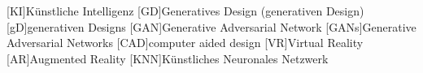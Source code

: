 \begin{acronym}
  [KI]{Künstliche Intelligenz}
  [GD]{Generatives Design (generativen Design)}
  [gD]{generativen Designs}
  [GAN]{Generative Adversarial Network}
  [GANs]{Generative Adversarial Networks}
  [CAD]{computer aided design}
  [VR]{Virtual Reality}
  [AR]{Augmented Reality}
  [KNN]{Künstliches Neuronales Netzwerk}
\end{acronym}